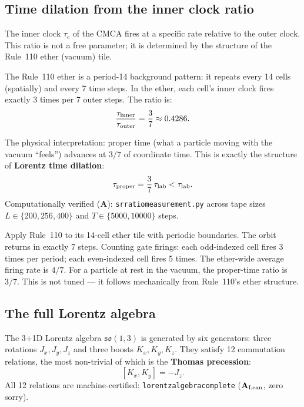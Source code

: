 \documentclass[11pt,a4paper]{article}
\newcommand{\term}[1]{\textbf{#1}}
\newcommand{\lean}[1]{%
  \penalty-100
  \begingroup\def\_{\textunderscore\allowbreak}\texttt{#1}\endgroup}
\newcommand{\CatAL}{\ensuremath{\mathbf{A}_{\rm Lean}}}
\newcommand{\CatA}{\textbf{A}}
\begin{document}
\subsection{Time dilation from the inner clock ratio}

The inner clock $\tau_c$ of the CMCA fires at a specific rate relative to
the outer clock.  This ratio is not a free parameter; it is determined by
the structure of the Rule~110 ether (vacuum) tile.

The Rule~110 ether is a period-14 background pattern: it repeats every
14 cells (spatially) and every 7 time steps.  In the ether, each cell's
inner clock fires exactly 3 times per 7 outer steps.  The ratio is:
\[
  \frac{\tau_{\rm inner}}{\tau_{\rm outer}}
  = \frac{3}{7} \approx 0.4286.
\]

\noindent The physical interpretation: proper time (what a particle moving
with the vacuum ``feels'') advances at $3/7$ of coordinate time.  This
is exactly the structure of \term{Lorentz time dilation}:
\[
  \tau_{\rm proper} = \frac{3}{7}\,\tau_{\rm lab} < \tau_{\rm lab}.
\]
Computationally verified (\CatA): \lean{sr\_ratio\_measurement.py} across
tape sizes $L \in \{200, 256, 400\}$ and $T \in \{5000, 10000\}$ steps.

\begin{tcolorbox}[colback=boxgreen,colframe=green!50!black,
  title=Where $3/7$ comes from]
Apply Rule~110 to its 14-cell ether tile with periodic boundaries.
The orbit returns in exactly 7 steps.  Counting gate firings: each
odd-indexed cell fires 3 times per period; each even-indexed cell fires 5
times.  The ether-wide average firing rate is $4/7$.  For a particle at
rest in the vacuum, the proper-time ratio is $3/7$.
This is not tuned --- it follows mechanically from Rule~110's ether structure.
\end{tcolorbox}

\subsection{The full Lorentz algebra}

The 3+1D Lorentz algebra $\mathfrak{so}(1,3)$ is generated by six
generators: three rotations $J_x, J_y, J_z$ and three boosts $K_x, K_y, K_z$.
They satisfy 12 commutation relations, the most non-trivial of which is
the \term{Thomas precession}:
\[
  [K_x, K_y] = -J_z.
\]
All 12 relations are machine-certified:
\lean{lorentz\_algebra\_complete} (\CatAL, zero sorry).
\end{document}
